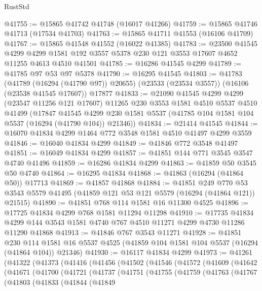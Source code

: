 \begin{lexlean}{RustStd}
\begin{coremodule}
@41755 := @15865 @41742 @41748 (@16017 @41266)
@41759 := @15865 @41746 @41713 (@17534 @41703)
@41763 := @15865 @41711 @41553 (@16106 @41709)
@41767 := @15865 @41548 @41552 (@16022 @41385)
@41783 := @23500
    @41545
    @4299
    @4299
    @1581
    @192
    @3557
    @5378
    @230
    @121
    @3553
    @17607
    @4652
    @11255
    @4613
    @4510
    @41501
@41785 := @16286 @41545 @4299
@41789 := @41785 @97 @53 @97 @5378
@41790 := @16295 @41545
@41803 := @41783
    (@41789 (@16294 (@41790 @97)) @20655)
    (@23533 (@23534 @3557))
    (@16106 (@23538 @41545 @17607))
    @17877
@41833 := @21090
    @41545
    @4299
    @4299
    (@23547 @11256 @121 @17607)
    @11265
    @230
    @3553
    @1581
    @4510
    @5537
    @4510
    @41499
    (@17847
      @41545
      @4299
      @230
      @1581
      @5537
      (@41785 @104 @1581 @104 @5537 (@16294 (@41790 @104)) @21346))
@41834 := @21414 @41545
@41844 := @16070 @41834 @4299 @1464 @772 @3548 @1581 @4510 @41497 @4299 @3559
@41846 := @16040 @41834 @4299
@41849 := @41846 @772 @3548 @41497
@41851 := @16049 @41834 @4299
@41857 := @41851 @144 @771 @3545 @3547 @4740 @41496
@41859 := @16286 @41834 @4299
@41863 := @41859 @50 @3545 @50 @4740
@41864 := @16295 @41834
@41868 := @41863 (@16294 (@41864 @50)) @17713
@41869 := @41857 @41868
@41884 := @41851
    @249
    @770
    @53
    @3543
    @5579
    @41495
    (@41859 @121 @53 @121 @5579 (@16294 (@41864 @121)) @21515)
@41890 := @41851 @768 @114 @1581 @16 @11300 @4525
@41896 := @17725 @41834 @4299 @768 @1581 @11294 @11298
@41910 := @17735
    @41834
    @4299
    @144
    @3543
    @1581
    @4740
    @767
    @4510
    @11271
    @4299
    @4730
    @11286
    @11290
    @41868
@41913 := @41846 @767 @3543 @11271
@41928 := @41851
    @230
    @114
    @1581
    @16
    @5537
    @4525
    (@41859 @104 @1581 @104 @5537 (@16294 (@41864 @104)) @21346)
@41930 := @16117 @41834 @4299
@41973 := @41261
    (@41322
      (@41373
        (@41416
          (@41456
            (@41502
              (@41546
                (@41572
                  (@41609
                    (@41642
                      (@41671
                        (@41700
                          (@41721
                            (@41737
                              (@41751
                                (@41755
                                  (@41759
                                    (@41763
                                      (@41767
                                        (@41803
                                          (@41833
                                            (@41844
                                              (@41849

\end{coremodule}
\end{lexlean}
